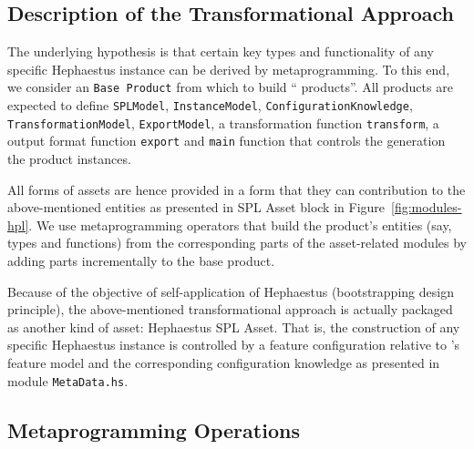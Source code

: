 
\subsection{Description of the Transformational Approach}

The underlying hypothesis is that certain key types and functionality of any specific Hephaestus instance can be derived by metaprogramming. To this end, we consider an \texttt{Base Product} from which to build ``\hpl{} products''. All products are expected to define \texttt{SPLModel}, \texttt{InstanceModel}, \texttt{ConfigurationKnowledge}, \texttt{TransformationModel}, \texttt{ExportModel}, a transformation function \texttt{transform}, a output format function \texttt{export} and \texttt{main} function that controls the generation the product instances.

All forms of assets are hence provided in a form that they can contribution to the above-mentioned entities as presented in SPL Asset block in Figure~\ref{fig:modules-hpl}. We use metaprogramming operators that build the product's entities (say, types and functions) from the corresponding parts of the asset-related modules by adding parts incrementally to the base product.

Because of the objective of self-application of Hephaestus (bootstrapping design principle), the above-mentioned transformational approach is actually packaged as another kind of asset: Hephaestus SPL Asset. That is, the construction of any specific Hephaestus instance is controlled by a feature configuration relative to \hpl's feature model and the corresponding configuration knowledge as presented in module \texttt{MetaData.hs}.


\subsection{Metaprogramming Operations} \label{sec:metaprogrammingOperations}

